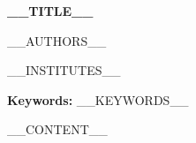 \documentclass{default}
\begin{document}
\begin{center}
  {\LARGE\bfseries __TITLE__\par}
  \vspace{1em}
  {\normalsize __AUTHORS__\par}
  \vspace{0.5em}
  {\small __INSTITUTES__\par}
\end{center}
\vspace{1em}

\begin{abstract}
__ABSTRACT__
\end{abstract}

\noindent\textbf{Keywords:} __KEYWORDS__
\vspace{1em}

__CONTENT__
\end{document}
